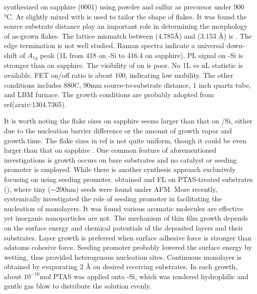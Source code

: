 \citeauthor{Zhang2013h} synthesized  on sapphire (0001) using  powder and sulfur as precursor under 900 \si{\degreeCelsius}.\cite{Zhang2013h} Ar slightly mixed with  is used to tailor the shape of  flakes. It was found the source substrate distance play an important role in determining the morphology of as-grown flakes. The lattice mismatch between  (4.785\AA) and  (3.153 \AA) is . The edge termination is not well studied. Raman spectra indicate a universal down-shift of $A_{1g}$ peak (1L from 418 on -Si to 416.4 on sapphire). PL signal on -Si is stronger than on sapphire. The visibility of  on  is poor. No 1L vs nL statistic is available. FET on/off ratio is about 100, indicating low mobility. The other conditions includes 880C, 90mm source-to-substrate distance, 1 inch quartz tube, and LBM furnace. The growth conditions are probably adopted from ref\cite{Huanga2013}(arxiv:1304.7365).

It is worth noting the flake sizes on sapphire \cite{Zhang2013h} seems larger than that on /Si\cite{Peimyoo2013}, either due to the nucleation barrier difference or the amount of growth vapor and growth time. The flake sizes in ref \cite{Cong2013} is not quite uniform, though it could be even larger than that on sapphire \cite{Zhang2013h}. One common feature of aforementioned investigations is growth occurs on bare substrates and no catalyst or seeding promoter is employed. While there is another synthesis approach \cite{Lee2013,Ling2014} exclusively focusing on using seeding promoter. \citeauthor{Lee2013} obtained  and  FL on PTAS-treated substrates (), where tiny ($\sim 200$nm) seeds were found under AFM. More recently, \citeauthor{Ling2014} systemically investigated the role of seeding promoter in facilitating the nucleation of  monolayers.\cite{Ling2014} It was found various aromatic molecules are effective yet inorganic nanoparticles are not. The mechanism of thin film growth depends on the surface energy and chemical potentials of the deposited layers and their substrates. Layer growth is preferred when surface adhesive force is stronger than adatoms cohesive force. Seeding promoter probably lowered the surface energy by wetting, thus provided heterogenous nucleation sites. Continuous  monolayer is obtained by evaporating 2 \AA  {} on desired receiving substrates. In each growth, about $10^{-10}$mol PTAS was applied onto -Si, which was rendered hydrophilic and gentle gas blow to distribute the solution evenly.

